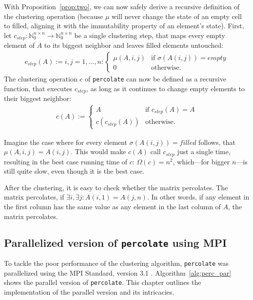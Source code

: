 \documentclass[twoside,11pt]{article}
\def\perc{\texttt{perco\-late}}
\begin{document}
With Proposition~\ref{prop:two}, we can now safely derive
a recursive definition of the clustering operation (because
$\mu$ will never change the state of an empty cell to
filled, aligning it with the immutability property of an
element's state).
First, let $c_{step}:\mathbb{N}_0^{n \times n} \rightarrow
\mathbb{N}_0^{n \times n}$ be a single clustering step,
that maps every empty element of $A$ to its biggest
neighbor and leaves filled elements untouched:
\begin{align*}
  c_{step}(A) := i,j=1,\dots,n: \begin{cases}
    \mu(A, i, j) &\text{if } \sigma(A(i, j)) = empty \\
    0 &\text{otherwise}.
  \end{cases}
\end{align*}
The clustering operation $c$ of \perc{} can now be defined
as a recursive function, that executes $c_{step}$, as long
as it continues to change empty elements to their biggest
neighbor:
\begin{align*}
  c(A) := \begin{cases}
    A &\text{if } c_{step}(A) = A \\
    c(c_{step}(A)) &\text{otherwise}.
  \end{cases}
\end{align*}

Imagine the case where for every element
$\sigma(A(i,j)) = filled$ follows, that
$\mu(A, i, j) = A(i, j)$.
This would make $c(A)$ call $c_{step}$ just a single time,
resulting in the best case running time of $c$:
$\Omega(c) = n^2$, which---for bigger $n$---is still quite
slow, even though it is the best case.

After the clustering, it is easy to check whether the
matrix percolates.
The matrix percolates, if $\exists i, \exists j: A(i,1) =
A(j,n)$.
In other words, if any element in the first column has the
same value as any element in the last column of $A$, the
matrix percolates.



\subsection{Parallelized version of \perc{} using MPI}

To tackle the poor performance of the clustering algorithm,
\perc{} was parallelized using the MPI Standard,
version 3.1 \citep[see][]{mpi}.
Algorithm~\ref{alg:perc_par} shows the parallel version of
\perc{}.
This chapter outlines the implementation of the parallel
version and its intricacies.
\end{document}
